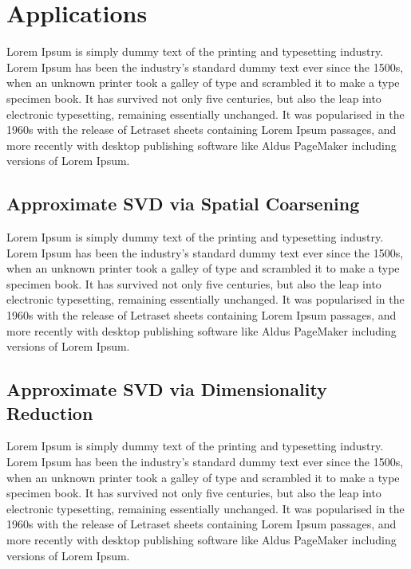 \documentclass{acm_proc_article-sp}
\begin{document}
\section{Applications}
\label{Applications}

Lorem Ipsum is simply dummy text of the printing and typesetting industry. Lorem Ipsum has been the industry's standard dummy text ever since the 1500s, when an unknown printer took a galley of type and scrambled it to make a type specimen book. It has survived not only five centuries, but also the leap into electronic typesetting, remaining essentially unchanged. It was popularised in the 1960s with the release of Letraset sheets containing Lorem Ipsum passages, and more recently with desktop publishing software like Aldus PageMaker including versions of Lorem Ipsum.

\subsection{Approximate SVD via Spatial Coarsening}
\label{sec:Applications Approximate SVD via Spatial Coarsening}

Lorem Ipsum is simply dummy text of the printing and typesetting industry. Lorem Ipsum has been the industry's standard dummy text ever since the 1500s, when an unknown printer took a galley of type and scrambled it to make a type specimen book. It has survived not only five centuries, but also the leap into electronic typesetting, remaining essentially unchanged. It was popularised in the 1960s with the release of Letraset sheets containing Lorem Ipsum passages, and more recently with desktop publishing software like Aldus PageMaker including versions of Lorem Ipsum.

\subsection{Approximate SVD via Dimensionality Reduction}
\label{sec:Applications Approximate SVD via Dimensionality Reduction}

Lorem Ipsum is simply dummy text of the printing and typesetting industry. Lorem Ipsum has been the industry's standard dummy text ever since the 1500s, when an unknown printer took a galley of type and scrambled it to make a type specimen book. It has survived not only five centuries, but also the leap into electronic typesetting, remaining essentially unchanged. It was popularised in the 1960s with the release of Letraset sheets containing Lorem Ipsum passages, and more recently with desktop publishing software like Aldus PageMaker including versions of Lorem Ipsum.
\end{document}
